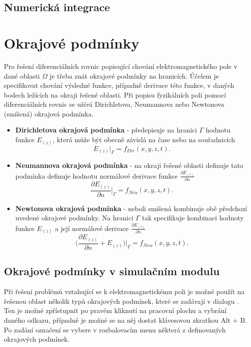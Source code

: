 \subsection{Numerická integrace}

\section{Okrajové podmínky}
Pro řešení diferenciálních rovnic popisující chování elektromagnetického pole v dané oblasti $\Omega$ je třeba znát okrajové podmínky na hranicích. Účelem je specifikovat chování výsledné funkce, případně derivace této funkce, v daných bodech ležících na okraji řešené oblasti. Při popisu fyzikálních polí pomocí diferenciálních rovnic se užívá Dirichletova, Neumannova nebo Newtonova (smíšená) okrajová podmínka.
\begin{itemize}
\item {\bf Dirichletova okrajová podmínka} - předepisuje na hranici $\Gamma$ hodnotu funkce $E_{(z)}$, která může být obecně závislá na čase nebo na souřadnicích
\begin{displaymath}
	E_{(z)}|_{\Gamma} = f_{Dir}(x,y,z,t). 
\end{displaymath}
\item {\bf Neumannova okrajová podmínka} - na okraji řešené oblasti definuje tato podmínka definuje hodnotu normálové derivace funkce $\frac{\partial E_{(z)}}{\partial n}$
\begin{displaymath}
	\frac{\partial E_{(z)}}{\partial n}|_{\Gamma} = f_{Neu}(x,y,z,t). 
\end{displaymath}
\item {\bf Newtonova okrajová podmínka} - neboli smíšená kombinuje obě předchozí uvedené okrajové podmínky. Na hranici $\Gamma$ tak specifikuje kombinaci hodnoty funkce $E_{(z)}$ a její normálové derivace $\frac{\partial E_{(z)}}{\partial n}$
\begin{displaymath}
	\bigg(\frac{\partial E_{(z)}}{\partial n} + E_{(z)}\bigg)|_{\Gamma} = f_{New}(x,y,z,t). 
\end{displaymath}
\end{itemize}

\subsection{Okrajové podmínky v simulačním modulu}
Při řešení problémů vztahující se k elektromagnetickému poli je možné použít na řešenou oblast několik typů okrajových podmínek, které se zadávají v dialogu . Ten je možné zpřístupnit po pravém kliknutí na pracovní plochu a vybrání daného odkazu, případně je možné se na něj dostat klávesovou zkratkou Alt + B. Po zadání označení se vybere v rozbalovacím menu některá z definovaných okrajových podmínek.

